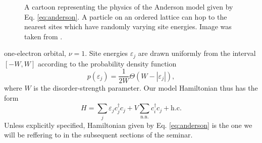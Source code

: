 \documentclass[10pt,a4paper]{article}
\begin{document}
\begin{minipage}[t]{0.45\textwidth}
\begin{figure}[H]
\caption{A cartoon representing the physics of the Anderson model given by Eq. \eqref{eq:anderson}. A particle on an ordered lattice can hop to the nearest sites which have randomly varying site energies. Image was taken from \cite{50yearsof}.}
\label{fig:disorder} 
\end{figure}
\end{minipage}
\noindent  one-electron orbital, $\nu=1$. Site
energies  $\varepsilon_j$ are drawn uniformly from the interval $[-W,W]$ according to the probability density function 
\begin{equation}\label{eq:probability}
p(\varepsilon_j)=\frac{1}{2W}\Theta(W-|\varepsilon_j|),
\end{equation}
where $W$ is the disorder-strength parameter. Our model Hamiltonian thus has the form 
\begin{equation}\label{eq:anderson}
H=\sum\limits_j \varepsilon_j c^\dagger_jc_j + V\sum\limits_{\text{n.n.}} c^\dagger_{i}c_j + \text{h.c.}
\end{equation}
Unless explicitly specified, Hamiltonian given by Eq. \eqref{eq:anderson} is the one we will be reffering to in the subsequent sections of the seminar. 
\end{document}
